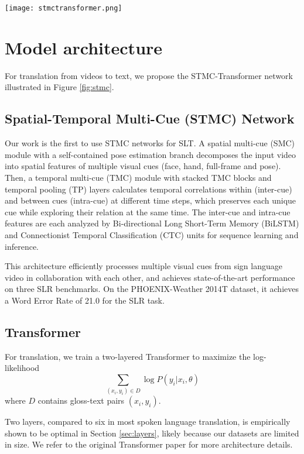 \documentclass[11pt]{article}
\begin{document}
\begin{figure*}
\center
    \texttt{[image: stmctransformer.png]}
    \caption{STMC-Transformer network for SLT. PE: Positional Encoding, MHA: Multihead Attention, FF: Feed Forward.}
    \label{fig:stmc}
\end{figure*} 

\section{Model architecture}

For translation from videos to text, we propose the STMC-Transformer network illustrated in Figure \ref{fig:stmc}.

\subsection{Spatial-Temporal Multi-Cue (STMC) Network}
Our work is the first to use STMC networks \cite{stmc} for SLT. A spatial multi-cue (SMC) module with a self-contained pose estimation branch decomposes the input video into spatial features of multiple visual cues (face, hand, full-frame and pose). Then, a temporal multi-cue (TMC) module with stacked TMC blocks and temporal pooling (TP) layers calculates temporal correlations within (inter-cue) and between cues (intra-cue) at different time steps, which preserves each unique cue while exploring their relation at the same time. The inter-cue and intra-cue features are each analyzed by Bi-directional Long Short-Term Memory (BiLSTM) \cite{rnn2} and Connectionist Temporal Classification (CTC) \cite{ctc} units for sequence learning and inference. 

This architecture efficiently processes multiple visual cues from sign language video in collaboration with each other, and achieves state-of-the-art performance on three SLR benchmarks. On the PHOENIX-Weather 2014T dataset, it achieves a Word Error Rate of 21.0 for the SLR task. 

\subsection{Transformer}

For translation, we train a two-layered Transformer to maximize the log-likelihood $$\sum_{(x_i, y_i) \in D} \log P(y_i | x_i, \theta)$$
where $D$ contains gloss-text pairs $(x_i, y_i)$. 

Two layers, compared to six in most spoken language translation, is empirically shown to be optimal in Section \ref{sec:layers}, likely because our datasets are limited in size. We refer to the original Transformer paper \cite{transformer} for more architecture details.
\end{document}
